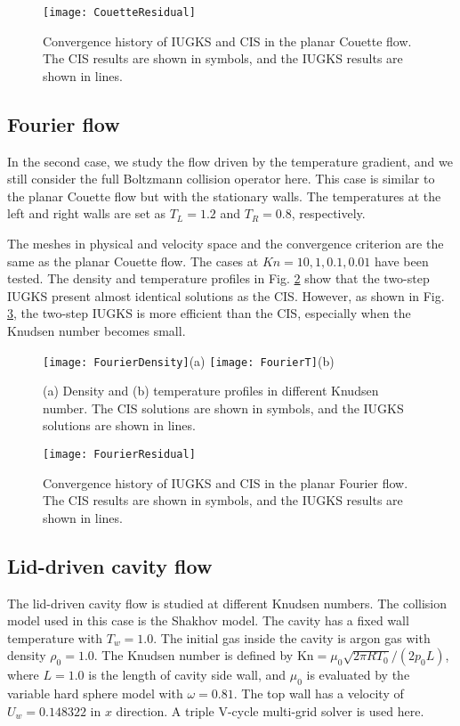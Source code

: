 \documentclass[3p,12pt]{elsarticle}
\begin{document}
	\begin{figure}
		\centering
		\texttt{[image: CouetteResidual]}
		\caption{Convergence history of IUGKS and CIS in the planar Couette flow. The CIS results are shown in symbols, and the IUGKS results are shown in lines.}
		\label{Residualcouette}
	\end{figure}
	
	
	\subsection{Fourier flow}
	In the second case, we study the flow driven by the temperature gradient, and we still consider the full Boltzmann collision operator here. This case is similar to the planar Couette flow but with the stationary walls. The temperatures at the left and right walls are set as $T_L = 1.2$ and $T_R = 0.8$, respectively.
	
	The meshes in physical and velocity space and the convergence criterion are the same as the planar Couette flow.
	The cases at $Kn = 10,1,0.1,0.01$ have been tested. The density and temperature profiles in Fig. \ref{fourier} show that the two-step IUGKS present almost identical solutions as the CIS. However, as shown in Fig. \ref{Residualfourier}, the two-step IUGKS is more efficient than the CIS, especially when the Knudsen number becomes small.
	
	
	
	\begin{figure}
		\centering
		\texttt{[image: FourierDensity]}{(a)}
		\texttt{[image: FourierT]}{(b)}
		\caption{(a) Density and (b) temperature profiles in different Knudsen number. The CIS solutions are shown in symbols, and the IUGKS solutions are shown in lines.}
		\label{fourier}
	\end{figure}
	
	\begin{figure}
		\centering
		\texttt{[image: FourierResidual]}
		\caption{Convergence history of IUGKS and CIS in the planar Fourier flow. The CIS results are shown in symbols, and the IUGKS results are shown in lines.}
		\label{Residualfourier}
	\end{figure}
	
	
	
	\subsection{Lid-driven cavity flow}
	The lid-driven cavity flow is studied at different Knudsen numbers. The collision model used in this case is the Shakhov model. The cavity has a fixed wall temperature with $T_w = 1.0$. The initial gas inside the cavity is argon gas with density $\rho_0 = 1.0$. The Knudsen number is defined by $\mathrm{Kn} = \mu_0 \sqrt{2\pi R T_0} / (2p_0 L)$, where $L = 1.0$ is the length of cavity side wall, and $\mu_0$ is evaluated by the variable hard sphere model with $\omega = 0.81$. The top wall has a velocity of $U_w = 0.148322$ in $x$ direction. A triple V-cycle multi-grid solver is used here.
	
\end{document}
